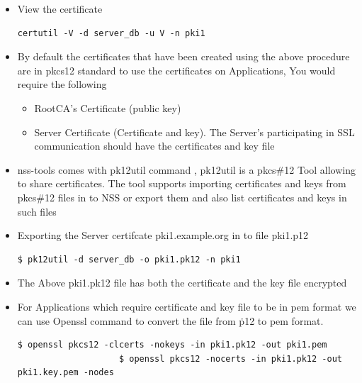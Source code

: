 \documentclass[a4paper]{article}
\begin{document}
\begin{enumerate}[label*=\arabic*.]
\begin{itemize}
            \item View the certificate
                \begin{lstlisting}[style=BashInputStyle]
                    certutil -V -d server_db -u V -n pki1
                \end{lstlisting}

            \item By default the certificates that have been created using the above procedure are in pkcs12 standard to use the certificates on Applications,  You would require the following
                \begin{itemize}
                    \item RootCA's Certificate (public key)
                    \item Server Certificate (Certificate and key). The Server's participating in SSL communication should have the certificates and key file
                \end{itemize}

            \item nss-tools comes with pk12util command , pk12util is a pkcs\#12 Tool allowing to share certificates. The tool supports importing certificates and keys from pkcs\#12 files in to NSS or export them and also list certificates and keys in such files

            \item Exporting the Server certifcate pki1.example.org in to file pki1.p12 
                \begin{lstlisting}[style=BashInputStyle]
                    $ pk12util -d server_db -o pki1.pk12 -n pki1
                \end{lstlisting}

            \item The Above pki1.pk12 file has both the certificate and the key file encrypted

            \item For Applications which require certificate and key file to be in pem format we can use Openssl command to convert the file from \.p12 to pem format.
                \begin{lstlisting}[style=BashInputStyle]
                    $ openssl pkcs12 -clcerts -nokeys -in pki1.pk12 -out pki1.pem
                    $ openssl pkcs12 -nocerts -in pki1.pk12 -out pki1.key.pem -nodes
                \end{lstlisting}
        \end{itemize}
\end{enumerate}
\end{document}
